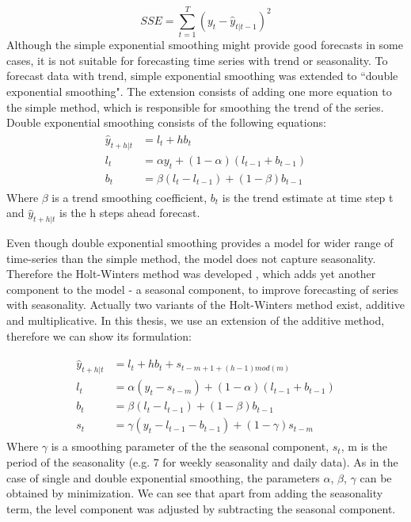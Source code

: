 \documentclass[11pt,a4paper]{article}
\begin{document}
\begin{equation}
SSE = \sum\limits_{t=1}^{T} (y_t - \hat{y}_{t|t-1})^2
\end{equation}
Although the simple exponential smoothing might provide good forecasts in some cases, it is not suitable for forecasting time series with trend or seasonality. To forecast data with trend, simple exponential smoothing was extended to ``double exponential smoothing". The extension consists of adding one more equation to the simple method, which is responsible for smoothing the trend of the series. Double exponential smoothing consists of the following equations:  
\begin{equation}
\begin{gathered}
\begin{aligned}
\hat{y}_{t+h|t} &= l_t + h b_t \\
l_t &= \alpha y_t + (1-\alpha)(l_{t-1} + b_{t-1}) \\
b_t &= \beta(l_t - l_{t-1}) + (1-\beta) b_{t-1}
\end{aligned}
\end{gathered}
\end{equation}
Where $\beta$ is a trend smoothing coefficient, $b_t$ is the trend estimate at time step t and $\hat{y}_{t+h|t}$ is the h steps ahead forecast. 

Even though double exponential smoothing provides a model for wider range of time-series than the simple method, the model does not capture seasonality. Therefore the Holt-Winters method was developed \cite{hyndman2014forecasting}, which adds yet another component to the model - a seasonal component, to improve forecasting of series with seasonality.
Actually two variants of the Holt-Winters method exist, additive and multiplicative.
In this thesis, we use an extension of the additive method, therefore we can show its formulation:

\begin{equation}
\begin{gathered}
\begin{aligned}
\hat{y}_{t+h|t} &= l_t + h b_t + s_{t-m+1+(h-1)mod( m)} \\
l_t &= \alpha (y_t - s_{t-m}) + (1-\alpha)(l_{t-1} + b_{t-1}) \\
b_t &= \beta(l_t - l_{t-1}) + (1-\beta) b_{t-1} \\
s_t &= \gamma(y_t - l_{t-1} - b_{t-1}) + (1-\gamma) s_{t-m}
\end{aligned}
\end{gathered}
\end{equation}
Where $\gamma$ is a smoothing parameter of the the seasonal component, $s_t$, m is the period of the seasonality (e.g. 7 for weekly seasonality and daily data). As in the case of single and double exponential smoothing, the parameters $\alpha$, $\beta$, $\gamma$ can be obtained by minimization. We can see that apart from adding the seasonality term, the level component was adjusted by subtracting the seasonal component.
\end{document}
